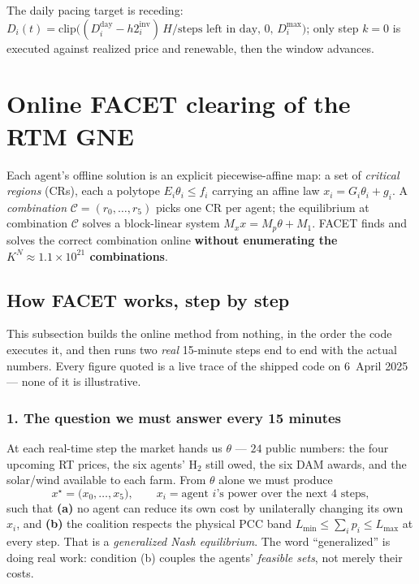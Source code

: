 \documentclass[11pt, letterpaper]{article}
\begin{document}
The daily pacing target is receding: $D_i(t)=\text{clip}\big((D^{\mathrm{day}}_i-h2^{\mathrm{inv}}_i)\,
H/\text{steps left in day},\,0,\,D^{\max}_i\big)$; only step $k=0$ is executed against realized price
and renewable, then the window advances.

\section{Online FACET clearing of the RTM GNE}\label{sec:facet}
Each agent's offline solution is an explicit piecewise-affine map: a set of \emph{critical regions}
(CRs), each a polytope $E_i\theta_i\le f_i$ carrying an affine law $x_i=G_i\theta_i+g_i$. A
\emph{combination} $\mathcal C=(r_0,\dots,r_5)$ picks one CR per agent; the equilibrium at combination
$\mathcal C$ solves a block-linear system $M_x x = M_p\theta+M_1$. FACET finds and solves the correct
combination online \textbf{without enumerating the $K^N\!\approx\!1.1\times10^{21}$ combinations}.

\subsection{How FACET works, step by step}\label{sec:walkthrough}
This subsection builds the online method from nothing, in the order the code executes it, and then
runs two \emph{real} 15-minute steps end to end with the actual numbers. Every figure quoted is a
live trace of the shipped code on 6~April 2025 --- none of it is illustrative.

\subsubsection*{1. The question we must answer every 15 minutes}
At each real-time step the market hands us $\theta$ --- $24$ public numbers: the four upcoming RT
prices, the six agents' H$_2$ still owed, the six DAM awards, and the solar/wind available to each
farm. From $\theta$ alone we must produce
\[
  x^\star=\bigl(x_0,\dots,x_5\bigr),\qquad x_i=\text{agent }i\text{'s power over the next 4 steps},
\]
such that \textbf{(a)} no agent can reduce its own cost by unilaterally changing its own $x_i$, and
\textbf{(b)} the coalition respects the physical PCC band $L_{\min}\le\sum_i p_i\le L_{\max}$ at
every step. That is a \emph{generalized Nash equilibrium}. The word ``generalized'' is doing real
work: condition (b) couples the agents' \emph{feasible sets}, not merely their costs.
\end{document}
